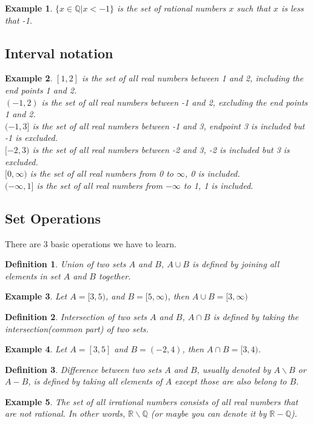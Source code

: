 \documentclass{article}
\newtheorem{definition}{Definition}
\newtheorem{ex}{Example}
\begin{document}
\begin{ex}
	$\{ x\in\mathbb{Q}|x<-1\}$ is the set of rational numbers $x$ such that $x$ is less that -1.
\end{ex}

\subsection*{Interval notation}
\begin{ex}
	$[1,2]$ is the set of all real numbers between 1 and 2, including the end points 1 and 2.\\
	$(-1,2)$ is the set of all real numbers between -1 and 2, excluding the end points 1 and 2.\\
	$(-1,3]$ is the set of all real numbers between -1 and 3, endpoint 3 is included but -1 is excluded.\\
	$[-2,3)$ is the set of all real numbers between -2 and 3, -2 is included but 3 is excluded.\\
	$[0,\infty)$ is the set of all real numbers from 0 to $\infty$, 0 is included.\\
	$(-\infty, 1]$ is the set of all real numbers from $-\infty$ to 1, 1 is included.
\end{ex}



\subsection*{Set Operations}
There are 3 basic operations we have to learn.
\begin{definition}
	Union of two sets $A$ and $B$, $A\cup B$ is defined by joining all elements in set $A$ and $B$ together.
\end{definition}
\begin{ex}
	Let $A= [3,5)$, and $B= [5,\infty)$, then $A\cup B = [3,\infty)$ 
\end{ex}

\begin{definition}
	Intersection of two sets $A$ and $B$, $A\cap B$ is defined by taking the intersection(common part) of two sets.
\end{definition}
\begin{ex}
	Let $A= [3,5]$ and $B=(-2,4)$, then $A\cap B = [3,4)$.
\end{ex}

\begin{definition}
	Difference between two sets $A$ and $B$, usually denoted by $A\backslash B$ or $A-B$, is defined by taking all elements of $A$ except those are also belong to $B$.
\end{definition}
\begin{ex}
	The set of all irrational numbers consists of all real numbers that are not rational. In other words, $\mathbb{R}\backslash\mathbb{Q}$ (or maybe you can denote it by $\mathbb{R}-\mathbb{Q}$). 
\end{ex}
\end{document}
